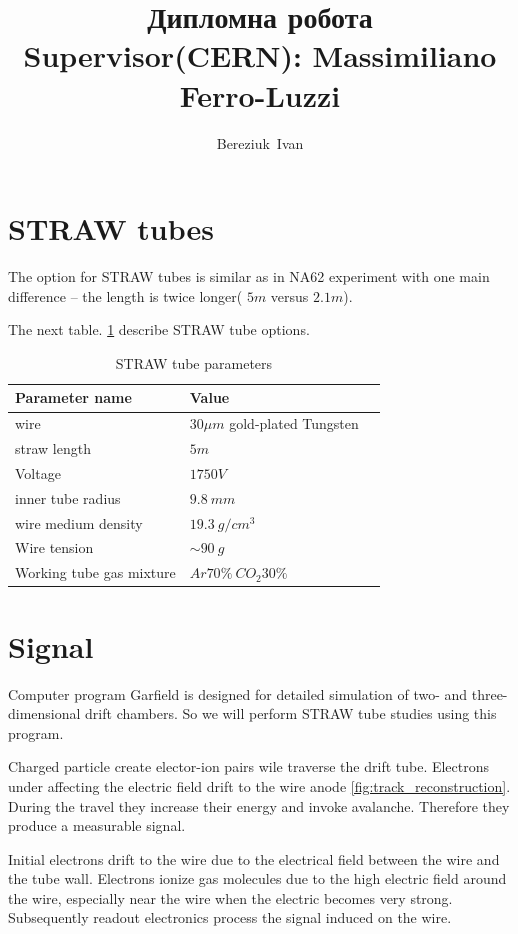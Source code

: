 \documentclass[]{article}
\author{Bereziuk~Ivan}
\title{ Дипломна робота \\
		Supervisor(CERN): Massimiliano Ferro-Luzzi\\
		}
\begin{document}
	 \linenumbers
	\maketitle
	\newpage
		
	
 \section{STRAW tubes}
	The option for STRAW tubes is similar as in NA62 experiment with one main difference -- the length is twice longer( $5m$ versus $2.1m$).
	
	The next table. \ref{table:straw_par} describe STRAW tube options.

	\begin{table}[h]
	\centering
	\begin{tabular}{|l|l|p{8cm}|}
		\hline
		Parameter name & Value \\
		\hline
		wire & $30\mu m$ gold-plated Tungsten\\
		\hline
		straw length & $5m$ \\
		\hline
		Voltage & $1750 V$ \\
		\hline
		inner tube radius & $9.8~mm$ \\
		\hline
		wire medium density & $19.3 ~g/cm^3$ \\
		\hline
		Wire tension& $\sim 90~g$ \\
		\hline
		Working tube gas mixture & $Ar70\% ~CO_2 30\%$ \\
		\hline
	\end{tabular}
	\caption[Table caption text]{STRAW tube parameters }
	\label{table:straw_par}
	\end{table}		
	
	\section{Signal}	
	Computer program Garfield \cite{garfield} is designed for detailed simulation of two- and three-dimensional drift chambers. So we will perform STRAW tube studies using this program.
	
	Charged particle  create elector-ion pairs wile traverse the drift tube. Electrons under affecting the electric field drift to the wire anode \ref{fig:track_reconstruction}. During the travel they increase their energy and invoke avalanche. Therefore they produce a measurable signal.

	  Initial electrons drift to the wire due to the electrical field between the wire and the tube wall. Electrons ionize gas molecules due to the high electric field around the wire, especially near the wire when the electric becomes very strong.  Subsequently readout electronics process the signal induced on the wire.
	  
\end{document}
